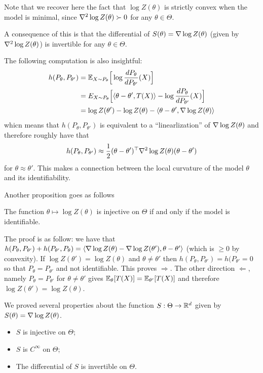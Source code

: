 Note that we recover here the fact that $\log Z(\theta)$ is strictly convex when the model is minimal, since $\nabla^2 \log Z(\theta) \succ 0$ for any $\theta \in \Theta$.

A consequence of this is that the differential of $S(\theta) = \nabla \log Z(\theta)$ (given by $\nabla^2 \log Z(\theta)$) is invertible for any $\theta \in \Theta$.

The following computation is also insightful:
\begin{align*}
	h(P_\theta, P_{\theta'}) &= \mathbb E_{X \sim P_\theta} \Big[ \log \frac{d P_\theta}{d P_{\theta'}}(X) \Big] \\
	&= E_{X \sim P_\theta}\Big[ \langle \theta - \theta', T(X) \rangle - \log \frac{d P_\theta}{d P_{\theta'}}(X)  \Big] \\
	&= \log Z(\theta') - \log Z(\theta) -  \langle \theta - \theta', \nabla \log Z(\theta) \rangle
\end{align*}
whicn means that $h(P_\theta, P_{\theta'})$ is equivalent to a ``linearlization'' of $\nabla \log Z(\theta)$ and therefore roughly have that
\begin{equation*}
	h(P_\theta, P_{\theta'}) \approx \frac 12 (\theta - \theta')^\top \nabla^2 \log Z(\theta) (\theta - \theta')
\end{equation*}
for $\theta \approx \theta'$. This makes a connection between the local curvature of the model  $\theta$ and its identifiability.

Another proposition goes as follows

\begin{proposition}
	The function $\theta \mapsto \log Z(\theta)$ is injective on $\Theta$ if and only if the model is identifiable.
\end{proposition}

The proof is as follow:
we have that $h(P_\theta, P_{\theta'}) + h(P_{\theta'}, P_{\theta}) = \langle \nabla \log Z(\theta)  - \nabla \log Z(\theta'), \theta - \theta' \rangle$ (which is $\geq 0$ by convexity).
If $ \log Z(\theta') =  \log Z(\theta)$ and $\theta \neq \theta'$ then $h(P_\theta, P_{\theta'}) = h(P_{\theta'} = 0$ so that $P_\theta = P_{\theta'}$ and not identifiable. This proves $\Rightarrow$. The other direction $\Leftarrow$, namely $P_\theta = P_{\theta'}$ for $\theta \neq \theta'$ gives $\mathbb E_\theta[T(X)] = \mathbb E_{\theta'}[T(X)]$ and therefore $\log Z(\theta') =  \log Z(\theta)$.

We proved several properties about the function $S : \Theta \rightarrow \mathbb R^d$ given by $S(\theta) = \nabla \log Z(\theta)$.
\begin{itemize}
	\item $S$ is injective on $\Theta$;
	\item $S$ is $C^\infty$ on $\Theta$;
	\item The differential of $S$ is invertible on $\Theta$.
\end{itemize}